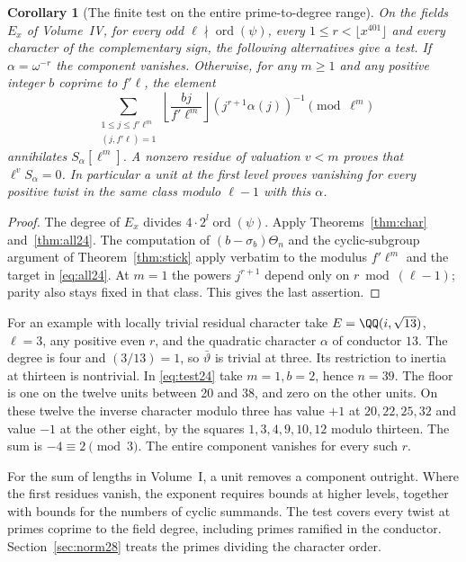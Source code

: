 \documentclass[a4paper,11pt]{article}
\newtheorem{corollary}[proposition]{Corollary}
\theoremstyle{definition}
\theoremstyle{remark}
\numberwithin{equation}{section}
\begin{document}
\begin{corollary}[The finite test on the entire prime-to-degree range]\leavevmode\label{cor:all24}
On the fields \(E_x\) of Volume~IV, for every odd \(\ell\nmid\operatorname{ord}(\psi)\), every \(1\le r<\lfloor x^{401}\rfloor\) and every character of the complementary sign, the following alternatives give a test. If \(\alpha=\omega^{-r}\) the component vanishes. Otherwise, for any \(m\ge1\) and any positive integer \(b\) coprime to \(f'\ell\), the element
\begin{equation}
 \sum_{\substack{1\le j\le f'\ell^m\\(j,f'\ell)=1}}
   \left\lfloor\frac{bj}{f'\ell^m}\right\rfloor
        (j^{r+1}\alpha(j))^{-1}\pmod{\ell^m}
 \label{eq:test24}
\end{equation}
annihilates \(S_\alpha[\ell^m]\). A nonzero residue of valuation \(v<m\) proves that \(\ell^v S_\alpha=0\). In particular a unit at the first level proves vanishing for every positive twist in the same class modulo \(\ell-1\) with this \(\alpha\).
\end{corollary}
\begin{proof}
The degree of \(E_x\) divides \(4\cdot 2^l\operatorname{ord}(\psi)\). Apply Theorems~\ref{thm:char} and~\ref{thm:all24}. The computation of \((b-\sigma_b)\Theta_n\) and the cyclic-subgroup argument of Theorem~\ref{thm:stick} apply verbatim to the modulus \(f'\ell^m\) and the target in \eqref{eq:all24}. At \(m=1\) the powers \(j^{r+1}\) depend only on \(r\bmod (\ell-1)\); parity also stays fixed in that class. This gives the last assertion.
\end{proof}

For an example with locally trivial residual character take \(E=\QQ(i,\sqrt{13})\), \(\ell=3\), any positive even \(r\), and the quadratic character \(\alpha\) of conductor \(13\). The degree is four and \((3/13)=1\), so \(\bar\vartheta\) is trivial at three. Its restriction to inertia at thirteen is nontrivial. In \eqref{eq:test24} take \(m=1, b=2\), hence \(n=39\). The floor is one on the twelve units between 20 and 38, and zero on the other units. On these twelve the inverse character modulo three has value \(+1\) at \(20,22,25,32\) and value \(-1\) at the other eight, by the squares \(1,3,4,9,10,12\) modulo thirteen. The sum is \(-4\equiv2\pmod3\). The entire component vanishes for every such \(r\).

For the sum of lengths in Volume~I, a unit removes a component outright. Where the first residues vanish, the exponent requires bounds at higher levels, together with bounds for the numbers of cyclic summands. The test covers every twist at primes coprime to the field degree, including primes ramified in the conductor. Section~\ref{sec:norm28} treats the primes dividing the character order.
\end{document}
